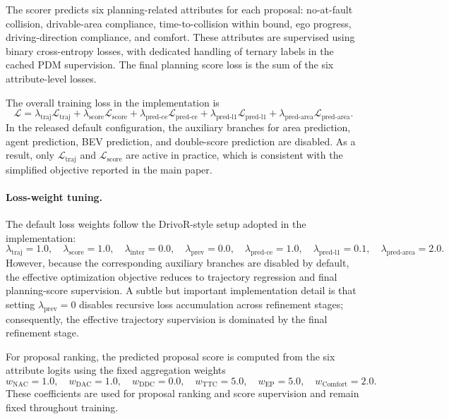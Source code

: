 The scorer predicts six planning-related attributes for each proposal: no-at-fault collision, drivable-area compliance, time-to-collision within bound, ego progress, driving-direction compliance, and comfort. These attributes are supervised using binary cross-entropy losses, with dedicated handling of ternary labels in the cached PDM supervision. The final planning score loss is the sum of the six attribute-level losses.

The overall training loss in the implementation is
\begin{equation}
\mathcal{L} =
\lambda_{\text{traj}} \mathcal{L}_{\text{traj}} +
\lambda_{\text{score}} \mathcal{L}_{\text{score}} +
\lambda_{\text{pred-ce}} \mathcal{L}_{\text{pred-ce}} +
\lambda_{\text{pred-l1}} \mathcal{L}_{\text{pred-l1}} +
\lambda_{\text{pred-area}} \mathcal{L}_{\text{pred-area}}.
\end{equation}
In the released default configuration, the auxiliary branches for area prediction, agent prediction, BEV prediction, and double-score prediction are disabled. As a result, only $\mathcal{L}_{\text{traj}}$ and $\mathcal{L}_{\text{score}}$ are active in practice, which is consistent with the simplified objective reported in the main paper.

\paragraph{Loss-weight tuning.}
The default loss weights follow the DrivoR-style setup adopted in the implementation:
\begin{equation}
\lambda_{\text{traj}} = 1.0,
\quad
\lambda_{\text{score}} = 1.0,
\quad
\lambda_{\text{inter}} = 0.0,
\quad
\lambda_{\text{prev}} = 0.0,
\quad
\lambda_{\text{pred-ce}} = 1.0,
\quad
\lambda_{\text{pred-l1}} = 0.1,
\quad
\lambda_{\text{pred-area}} = 2.0.
\end{equation}
However, because the corresponding auxiliary branches are disabled by default, the effective optimization objective reduces to trajectory regression and final planning-score supervision. A subtle but important implementation detail is that setting $\lambda_{\text{prev}} = 0$ disables recursive loss accumulation across refinement stages; consequently, the effective trajectory supervision is dominated by the final refinement stage.

For proposal ranking, the predicted proposal score is computed from the six attribute logits using the fixed aggregation weights
\begin{equation}
w_{\text{NAC}} = 1.0, \quad
w_{\text{DAC}} = 1.0, \quad
w_{\text{DDC}} = 0.0, \quad
w_{\text{TTC}} = 5.0, \quad
w_{\text{EP}} = 5.0, \quad
w_{\text{Comfort}} = 2.0.
\end{equation}
These coefficients are used for proposal ranking and score supervision and remain fixed throughout training.
